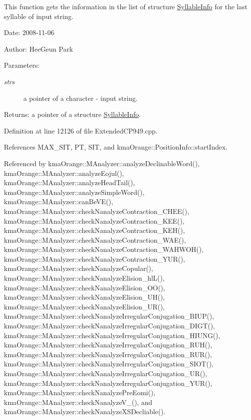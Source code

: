 This function gets the information in the list of structure \hyperlink{structkmaOrange_1_1SyllableInfo}{SyllableInfo} for the last syllable of input string. 

\begin{Desc}
\item[Date:]2008-11-06 \end{Desc}
\begin{Desc}
\item[Author:]HeeGeun Park \end{Desc}
\begin{Desc}
\item[Parameters:]
\begin{description}
\item[{\em strs}]a pointer of a character - input string. \end{description}
\end{Desc}
\begin{Desc}
\item[Returns:]a pointer of a structure \hyperlink{structkmaOrange_1_1SyllableInfo}{SyllableInfo}. \end{Desc}


Definition at line 12126 of file ExtendedCP949.cpp.

References MAX\_\-SIT, PT, SIT, and kmaOrange::PositionInfo::startIndex.

Referenced by kmaOrange::MAnalyzer::analyzeDeclinableWord(), kmaOrange::MAnalyzer::analyzeEojul(), kmaOrange::MAnalyzer::analyzeHeadTail(), kmaOrange::MAnalyzer::analyzeSimpleWord(), kmaOrange::MAnalyzer::canBeVE(), kmaOrange::MAnalyzer::checkNanalyzeContraction\_\-CHEE(), kmaOrange::MAnalyzer::checkNanalyzeContraction\_\-KEE(), kmaOrange::MAnalyzer::checkNanalyzeContraction\_\-KEH(), kmaOrange::MAnalyzer::checkNanalyzeContraction\_\-WAE(), kmaOrange::MAnalyzer::checkNanalyzeContraction\_\-WAHWOH(), kmaOrange::MAnalyzer::checkNanalyzeContraction\_\-YUR(), kmaOrange::MAnalyzer::checkNanalyzeCopular(), kmaOrange::MAnalyzer::checkNanalyzeElision\_\-hlL(), kmaOrange::MAnalyzer::checkNanalyzeElision\_\-OO(), kmaOrange::MAnalyzer::checkNanalyzeElision\_\-UH(), kmaOrange::MAnalyzer::checkNanalyzeElision\_\-UR(), kmaOrange::MAnalyzer::checkNanalyzeIrregularConjugation\_\-BIUP(), kmaOrange::MAnalyzer::checkNanalyzeIrregularConjugation\_\-DIGT(), kmaOrange::MAnalyzer::checkNanalyzeIrregularConjugation\_\-HIUNG(), kmaOrange::MAnalyzer::checkNanalyzeIrregularConjugation\_\-RUH(), kmaOrange::MAnalyzer::checkNanalyzeIrregularConjugation\_\-RUR(), kmaOrange::MAnalyzer::checkNanalyzeIrregularConjugation\_\-SIOT(), kmaOrange::MAnalyzer::checkNanalyzeIrregularConjugation\_\-UR(), kmaOrange::MAnalyzer::checkNanalyzeIrregularConjugation\_\-YUR(), kmaOrange::MAnalyzer::checkNanalyzePreEomi(), kmaOrange::MAnalyzer::checkNanalyzeV\_\-(), and kmaOrange::MAnalyzer::checkNanalyzeXSDecliable().

